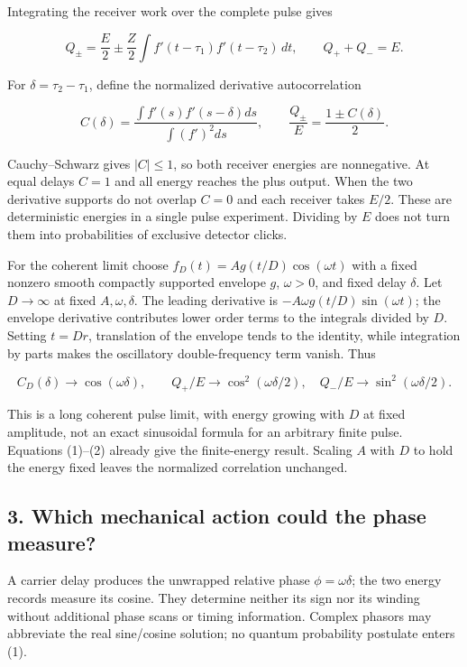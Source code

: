 \documentclass[11pt,a4paper]{article}
\begin{document}
Integrating the receiver work over the complete pulse gives

\[
Q_\pm=\frac E2\pm\frac Z2
 \int f'(t-\tau_1)f'(t-\tau_2)\,dt,
\qquad Q_++Q_-=E. \tag{1}
\]

For \(\delta=\tau_2-\tau_1\), define the normalized derivative
autocorrelation

\[
C(\delta)=\frac{\int f'(s)f'(s-\delta)ds}{\int(f')^2ds},
\qquad \frac{Q_\pm}{E}=\frac{1\pm C(\delta)}2. \tag{2}
\]

Cauchy--Schwarz gives \(|C|\le1\), so both receiver energies are
nonnegative. At equal delays \(C=1\) and all energy reaches the plus
output. When the two derivative supports do not overlap \(C=0\) and each
receiver takes \(E/2\). These are deterministic energies in a single
pulse experiment. Dividing by \(E\) does not turn them into
probabilities of exclusive detector clicks.

For the coherent limit choose \(f_D(t)=A g(t/D)\cos(\omega t)\) with a
fixed nonzero smooth compactly supported envelope \(g\), \(\omega>0\),
and fixed delay \(\delta\). Let \(D\to\infty\) at fixed
\(A,\omega,\delta\). The leading derivative is
\(-A\omega g(t/D)\sin(\omega t)\); the envelope derivative contributes
lower order terms to the integrals divided by \(D\). Setting \(t=Dr\),
translation of the envelope tends to the identity, while integration by
parts makes the oscillatory double-frequency term vanish. Thus

\[
C_D(\delta)\longrightarrow\cos(\omega\delta),\qquad
Q_+/E\longrightarrow\cos^2(\omega\delta/2),\quad
Q_-/E\longrightarrow\sin^2(\omega\delta/2). \tag{3}
\]

This is a long coherent pulse limit, with energy growing with \(D\) at
fixed amplitude, not an exact sinusoidal formula for an arbitrary finite
pulse. Equations (1)--(2) already give the finite-energy result. Scaling
\(A\) with \(D\) to hold the energy fixed leaves the normalized
correlation unchanged.

\hypertarget{which-mechanical-action-could-the-phase-measure}{%
\subsection{3. Which mechanical action could the phase
measure?}\label{which-mechanical-action-could-the-phase-measure}}

A carrier delay produces the unwrapped relative phase
\(\phi=\omega\delta\); the two energy records measure its cosine. They
determine neither its sign nor its winding without additional phase
scans or timing information. Complex phasors may abbreviate the real
sine/cosine solution; no quantum probability postulate enters (1).
\end{document}
